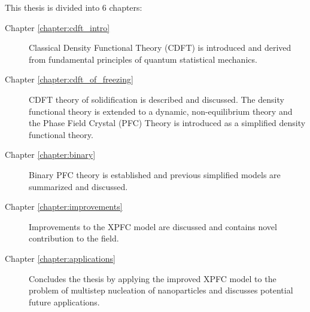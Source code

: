 \label{chapter:introduction}













This thesis is divided into 6 chapters:
%
\begin{description}
    \item [Chapter \ref{chapter:cdft_intro}] { Classical Density Functional
        Theory (CDFT) is introduced and derived from fundamental principles of
        quantum statistical mechanics.
    }
    \item [Chapter \ref{chapter:cdft_of_freezing}] { CDFT theory of
        solidification is described and discussed. The density functional
        theory is extended to a dynamic, non-equilibrium theory and the Phase
        Field Crystal (PFC) Theory is introduced as a simplified density
        functional theory.
    }
    \item [Chapter \ref{chapter:binary}] { Binary PFC theory is established and
        previous simplified models are summarized and discussed.
    }
    \item [Chapter \ref{chapter:improvements}] { Improvements to the XPFC model
        are discussed and contains novel contribution to the field.
    }
    \item [Chapter \ref{chapter:applications}] { Concludes the thesis by
        applying the improved XPFC model to the problem of multistep nucleation
        of nanoparticles and discusses potential future applications.
    } 
\end{description}
%

